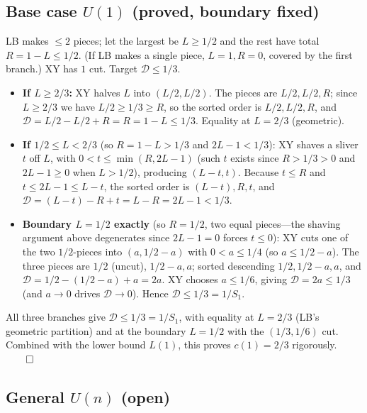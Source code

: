 \documentclass[11pt]{article}
\theoremstyle{definition}
\newcommand{\D}{\mathcal{D}}
\begin{document}
\subsection{Base case $U(1)$ (proved, boundary fixed)}

LB makes $\le 2$ pieces; let the largest be $L\ge 1/2$ and the rest have total
$R=1-L\le 1/2$. (If LB makes a single piece, $L=1,R=0$, covered by the first
branch.) XY has $1$ cut. Target $\D\le 1/3$.
\begin{itemize}[leftmargin=2em]
\item \textbf{If $L\ge 2/3$:} XY halves $L$ into $(L/2,L/2)$. The pieces are
$L/2,L/2,R$; since $L\ge 2/3$ we have $L/2\ge 1/3\ge R$, so the sorted order is
$L/2,L/2,R$, and $\D=L/2-L/2+R=R=1-L\le 1/3$. Equality at $L=2/3$ (geometric).
\item \textbf{If $1/2\le L<2/3$} (so $R=1-L>1/3$ and $2L-1<1/3$): XY shaves a
sliver $t$ off $L$, with $0<t\le\min(R,2L-1)$ (such $t$ exists since $R>1/3>0$
and $2L-1\ge 0$ when $L>1/2$), producing $(L-t,t)$. Because $t\le R$ and
$t\le 2L-1\le L-t$, the sorted order is $(L-t),R,t$, and
$\D=(L-t)-R+t=L-R=2L-1<1/3$.
\item \textbf{Boundary $L=1/2$ exactly} (so $R=1/2$, two equal pieces---the
shaving argument above degenerates since $2L-1=0$ forces $t\le 0$): XY cuts
one of the two $1/2$-pieces into $(a,1/2-a)$ with $0<a\le 1/4$ (so
$a\le 1/2-a$). The three pieces are $1/2$ (uncut), $1/2-a,a$; sorted descending
$1/2,1/2-a,a$, and $\D=1/2-(1/2-a)+a=2a$. XY chooses $a\le 1/6$, giving
$\D=2a\le 1/3$ (and $a\to 0$ drives $\D\to 0$). Hence $\D\le 1/3=1/S_1$.
\end{itemize}
All three branches give $\D\le 1/3=1/S_1$, with equality at $L=2/3$ (LB's
geometric partition) and at the boundary $L=1/2$ with the $(1/3,1/6)$ cut.
Combined with the lower bound $L(1)$, this proves $c(1)=2/3$ rigorously. $\qed$

\subsection{General $U(n)$ (open)}
\end{document}
